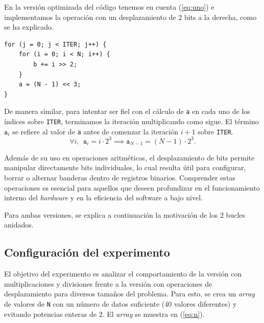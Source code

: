 \documentclass[11pt,a4paper,twoside]{article}
\theoremstyle{definition}
\begin{document}
	En la versión optimizada del código tenemos en cuenta (\ref{eq:uno}) e implementamos la operación con un desplazamiento de 2 bits a la derecha, como se ha explicado.
	\begin{verbatim}
for (j = 0; j < ITER; j++) {
	for (i = 0; i < N; i++) {
		b += i >> 2;
	}
	a = (N - 1) << 3;
}
	\end{verbatim}

	De manera similar, para intentar ser fiel con el cálculo de \texttt{a} en cada uno de los índices sobre \texttt{ITER}, terminamos la iteración multiplicando como sigue. El término $\texttt{a}_i$ se refiere al valor de \texttt{a} antes de comenzar la iteración $i+1$ sobre \texttt{ITER}.
	\begin{equation}\label{eq:dos}
		\forall i, \:\: \texttt{a}_i = i \cdot 2^3 \implies \texttt{a}_{N-1} = (N-1)\cdot 2^3.
	\end{equation}
	
	Además de su uso en operaciones aritméticas, el desplazamiento de bits permite manipular directamente bits individuales, lo cual resulta útil para configurar, borrar o alternar banderas dentro de registros binarios. Comprender estas operaciones es esencial para aquellos que deseen profundizar en el funcionamiento interno del \textit{hardware} y en la eficiencia del software a bajo nivel.
	
	Para ambas versiones, se explica a continuación la motivación de los 2 bucles anidados.
	
	\subsection{Configuración del experimento}
	
	El objetivo del experimento es analizar el comportamiento de la versión con multiplicaciones y divisiones frente a la versión con operaciones de desplazamiento para diversos tamaños del problema. Para esto, se crea un \textit{array} de valores de \texttt{N} con un número de datos suficiente (40 valores diferentes) y evitando potencias enteras de 2. El \textit{array} se muestra en (\ref{eq:n}).
	
\end{document}
